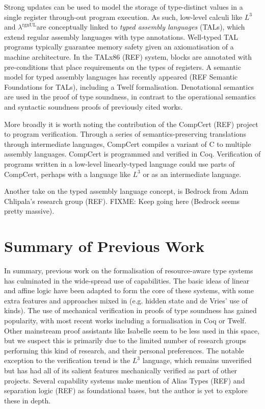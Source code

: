 \documentclass[]{unswthesis}
\newcommand{\rgnUL}{$\lambda^\text{rgnUL}$\text{ }}
\newcommand{\SSPHS}{\text{SSPHS}}
\begin{document}
Strong updates can be used to model the storage of type-distinct values in a single register through-out program execution. As such, low-level calculi like $L^3$ and \rgnUL are conceptually linked to \textit{typed assembly languages} (TALs), which extend regular assembly languages with type annotations. Well-typed TAL programs typically guarantee memory safety given an axiomatisation of a machine architecture. In the TALx86 (REF) system, blocks are annotated with pre-conditions that place requirements on the types of registers. A semantic model for typed assembly languages has recently appeared (REF Semantic Foundations for TALs), including a Twelf formalisation. Denotational semantics are used in the proof of type soundness, in contrast to the operational semantics and syntactic soundness proofs of previously cited works.

More broadly it is worth noting the contribution of the CompCert (REF) project to program verification. Through a series of semantics-preserving translations through intermediate languages, CompCert compiles a variant of C to multiple assembly languages. CompCert is programmed and verified in Coq. Verification of programs written in a low-level linearly-typed language could use parts of CompCert, perhaps with a language like $L^3$ or \SSPHS as an intermediate language.

Another take on the typed assembly language concept, is Bedrock from Adam Chlipala's research group (REF). FIXME: Keep going here (Bedrock seems pretty massive).


\section{Summary of Previous Work}

In summary, previous work on the formalisation of resource-aware type systems has culminated in the wide-spread use of capabilities. The basic ideas of linear and affine logic have been adapted to form the core of these systems, with some extra features and approaches mixed in (e.g. hidden state and de Vries' use of kinds). The use of mechanical verification in proofs of type soundness has gained popularity, with most recent works including a formalisation in Coq or Twelf. Other mainstream proof assistants like Isabelle seem to be less used in this space, but we suspect this is primarily due to the limited number of research groups performing this kind of research, and their personal preferences. The notable exception to the verification trend is the $L^3$ language, which remains unverified but has had all of its salient features mechanically verified as part of other projects. Several capability systems make mention of Alias Types (REF) and separation logic (REF) as foundational bases, but the author is yet to explore these in depth.
\end{document}
